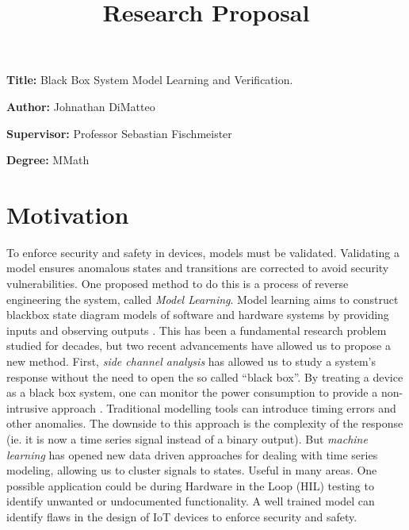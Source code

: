 \documentclass[11pt, a4paper]{article}
\title{Research Proposal}
\author{}
\date{}
\newcommand{\namelistlabel}[1]{\mbox{#1}\hfil}
\newenvironment{namelist}[1]{%
\begin{list}{}
    {
        \let\makelabel\namelistlabel
        \settowidth{\labelwidth}{#1}
        \setlength{\leftmargin}{1.1\labelwidth}
    }
  }{%
\end{list}}
\begin{document}
\maketitle

\begin{namelist}{xxxxxxxxxxxx}
\item[{\bf Title:}]
	Black Box System Model Learning and Verification.
\item[{\bf Author:}]
	Johnathan DiMatteo
\item[{\bf Supervisor:}]
	Professor Sebastian Fischmeister
\item[{\bf Degree:}]
	MMath
\end{namelist}

\section*{Motivation} 


To enforce security and safety in devices, models must be validated.
Validating a model ensures anomalous states and transitions are corrected to avoid security vulnerabilities.
One proposed method to do this is a process of reverse engineering the system, called \textit{Model Learning}.
Model learning aims to construct blackbox state diagram models of software and hardware systems by providing inputs and observing outputs \cite{modellearning}.
This has been a fundamental research problem studied for decades, but two recent advancements have allowed us to propose a new method.
First, \textit{side channel analysis} has allowed us to study a system's response without the need to open the so called ``black box''.
By treating a device as a black box system, one can monitor the power consumption to provide a non-intrusive approach \cite{seb}.
Traditional modelling tools can introduce timing errors and other anomalies. 
The downside to this approach is the complexity of the response (ie. it is now a time series signal instead of a binary output).
But \textit{machine learning} has opened new data driven approaches for dealing with time series modeling, allowing us to cluster signals to states.
Useful in many areas.
One possible application could be during Hardware in the Loop (HIL) testing to identify unwanted or undocumented functionality.
A well trained model can identify flaws in the design of IoT devices to enforce security and safety.
\end{document}
